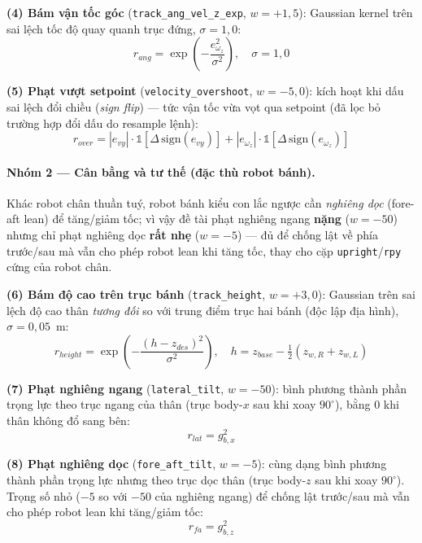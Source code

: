 \textbf{(4) Bám vận tốc góc} (\texttt{track\_ang\_vel\_z\_exp}, $w=+1{,}5$):
Gaussian kernel trên sai lệch tốc độ quay quanh trục đứng, $\sigma=1{,}0$:
\begin{equation}
    r_{ang} = \exp\!\left(-\frac{e_{\omega_z}^2}{\sigma^2}\right),
    \quad \sigma=1{,}0
    \label{eq:rew_ang}
\end{equation}

\textbf{(5) Phạt vượt setpoint} (\texttt{velocity\_overshoot}, $w=-5{,}0$):
kích hoạt khi dấu sai lệch đổi chiều (\textit{sign flip}) --- tức vận tốc
vừa vọt qua setpoint (đã lọc bỏ trường hợp đổi dấu do resample lệnh):
\begin{equation}
    r_{over} = |e_{vy}|\cdot\mathbb{1}[\Delta\,\mathrm{sign}(e_{vy})]
             + |e_{\omega_z}|\cdot\mathbb{1}[\Delta\,\mathrm{sign}(e_{\omega_z})]
    \label{eq:rew_overshoot}
\end{equation}

\paragraph{Nhóm 2 --- Cân bằng và tư thế (đặc thù robot bánh).}
Khác robot chân thuần tuý, robot bánh kiểu con lắc ngược cần \emph{nghiêng
dọc} (fore-aft lean) để tăng/giảm tốc; vì vậy đề tài phạt nghiêng ngang
\textbf{nặng} ($w=-50$) nhưng chỉ phạt nghiêng dọc \textbf{rất nhẹ} ($w=-5$)
--- đủ để chống lật về phía trước/sau mà vẫn cho phép robot lean khi tăng tốc,
thay cho cặp \texttt{upright}/\texttt{rpy} cứng của robot chân.

\textbf{(6) Bám độ cao trên trục bánh} (\texttt{track\_height}, $w=+3{,}0$):
Gaussian trên sai lệch độ cao thân \emph{tương đối} so với trung điểm trục
hai bánh (độc lập địa hình), $\sigma=0{,}05$~m:
\begin{equation}
    r_{height} = \exp\!\left(-\frac{(h - z_{des})^2}{\sigma^2}\right),
    \quad h = z_{base} - \tfrac{1}{2}\!\left(z_{w,R}+z_{w,L}\right)
    \label{eq:rew_height}
\end{equation}

\textbf{(7) Phạt nghiêng ngang} (\texttt{lateral\_tilt}, $w=-50$): bình
phương thành phần trọng lực theo trục ngang của thân (trục body-$x$ sau khi
xoay $90^\circ$), bằng 0 khi thân không đổ sang bên:
\begin{equation}
    r_{lat} = g_{b,x}^2
    \label{eq:rew_lateral}
\end{equation}

\textbf{(8) Phạt nghiêng dọc} (\texttt{fore\_aft\_tilt}, $w=-5$): cùng dạng
bình phương thành phần trọng lực nhưng theo trục dọc thân (trục body-$z$ sau
khi xoay $90^\circ$). Trọng số nhỏ ($-5$ so với $-50$ của nghiêng ngang) để
chống lật trước/sau mà vẫn cho phép robot lean khi tăng/giảm tốc:
\begin{equation}
    r_{fa} = g_{b,z}^2
    \label{eq:rew_foreaft}
\end{equation}

